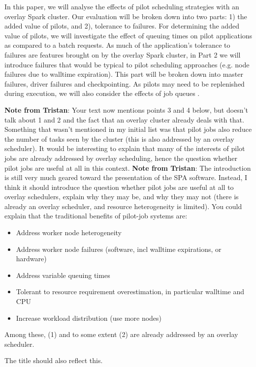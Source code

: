 \documentclass{IEEEtran}
\newcommand{\tristan}[1]{\color{red}\textbf{Note from Tristan}:
      #1 \color{black}}
\newcommand{\TG}[1]{\tristan{#1}}
\newcommand{\todo}[1]{\marginpar{\parbox{18mm}{\flushleft\tiny\color{red}\textbf{TODO}:
      #1}}}
\begin{document}
In this paper, we will analyse the effects of pilot scheduling strategies with an 
overlay Spark cluster. Our evaluation will be broken down into two parts: 1)
the added value of pilots, and 2), tolerance to failures. For determining the 
added value of pilots, we will investigate the effect of queuing times on 
pilot applications as compared to a batch requests. As much of the application's
tolerance to failures are features brought on by the overlay Spark cluster, in
Part 2 we will introduce failures that would be typical to pilot scheduling 
approaches (e.g. node failures due to walltime expiration). This part will be 
broken down into master failures, driver failures and checkpointing. As pilots 
may need to be replenished during execution, we will also consider the effects of 
job queues \todo{reword}.

\tristan{Your text now mentions points 3 and 4 below, but doesn't talk about 1 and 2 and the fact that
an overlay cluster already deals with that. Something that wasn't mentioned in my initial list was that pilot jobs
also reduce the number of tasks seen by the cluster (this is also addressed by an overlay scheduler). It would be interesting
to explain that many of the interests of pilot jobs are already addressed by overlay scheduling, hence the question whether
pilot jobs are useful at all in this context.}
\TG{The introduction is still very much geared toward the presentation of 
the SPA software. Instead, I think it should introduce the question whether pilot jobs
are useful at all to overlay schedulers, explain why they may be, and why they may not (there is already an overlay scheduler,
and resource heterogeneity is limited). You could explain that the traditional benefits of pilot-job systems are:
\begin{itemize}
    \item Address worker node heterogeneity
    \item Address worker node failures (software, incl walltime expirations, or hardware)
    \item Address variable queuing times
    \item Tolerant to resource requirement overestimation, in particular walltime and CPU
    \item Increase workload distribution (use more nodes)
\end{itemize}
Among these, (1) and to some extent (2) are already addressed by an overlay scheduler.

The title should also reflect this.
}
\end{document}
